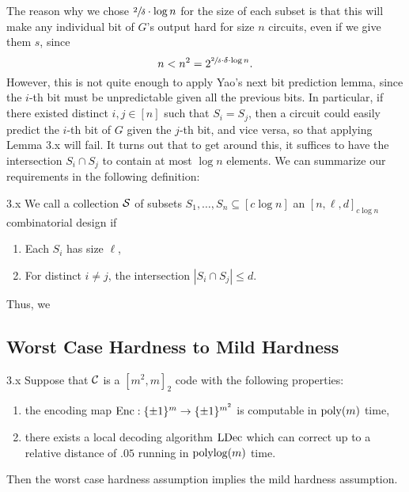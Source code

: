 \documentclass[11pt]{article}
\begin{document}
\noindent
The reason why we chose $\sfrac{2}{\delta} \cdot \log n$ for the size of each subset is that this will make any individual bit of $G$'s output hard for size $n$ circuits, even if we give them $s$, since
\begin{equation*}
    n < n^2 = 2^{\sfrac{2}{\delta} \cdot \delta \cdot \log n}.
\end{equation*}
However, this is not quite enough to apply Yao's next bit prediction lemma, since the $i$-th bit must be unpredictable given all the previous bits. In particular, if there existed distinct $i, j \in [n]$ such that $S_i = S_j$, then a circuit could easily predict the $i$-th bit of $G$ given the $j$-th bit, and vice versa, so that applying Lemma 3.x will fail. It turns out that to get around this, it suffices to have the intersection $S_i \cap S_j$ to contain at most $\log n$ elements. We can summarize our requirements in the following definition:

\begin{definition}{3.x}
    We call a collection $\mathcal{S}$ of subsets $S_1, \ldots, S_n \subseteq [c \log n]$ an $[n, \ell, d]_{c \log n}$ combinatorial design if
    \begin{enumerate}
        \item Each $S_i$ has size $\ell$, 
        \item For distinct $i \neq j$, the intersection $|S_i \cap S_j| \leq d$.
    \end{enumerate}
\end{definition}

Thus, we 

\subsection{Worst Case Hardness to Mild Hardness}

\begin{theorem}{3.x}
    Suppose that $\mathcal{C}$ is a $[m^2, m]_2$ code with the following properties:
    \begin{enumerate}
        \item the encoding map $\mathrm{Enc} : \{\pm 1\}^m \rightarrow \{\pm 1\}^{m^2}$ is computable in $\mathrm{poly}(m)$ time,
        \item there exists a local decoding algorithm ${\textup{LDec}}$ which can correct up to a relative distance of $.05$ running in $\mathrm{polylog}(m)$ time.
    \end{enumerate}
    Then the worst case hardness assumption implies the mild hardness assumption.
\end{theorem}
\end{document}

